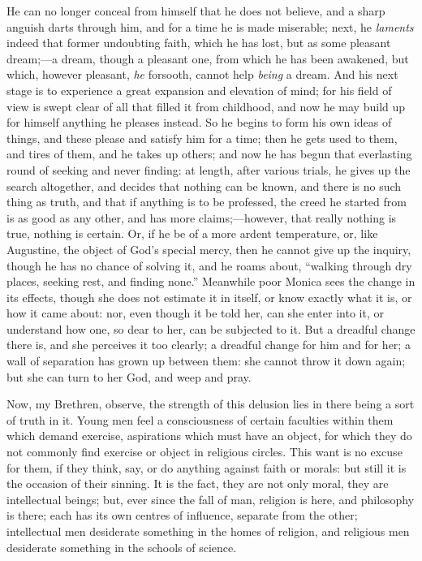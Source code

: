 He can no longer conceal from himself that he does not
believe, and a sharp anguish darts through him, and for a
time he is made miserable; next, he \emph{laments}
indeed that former undoubting faith, which he has lost,
but as some pleasant dream;—a dream, though a
pleasant one, from which he has been awakened, but which,
however pleasant, \emph{he} forsooth, cannot help \emph{being}
a dream. And his next stage is to experience a great
expansion and elevation of mind; for his field of view is
swept clear of all that filled it from childhood, and now
he may build up for himself anything he pleases instead.
So he begins to form his own ideas of things, and these
please and satisfy him for a time; then he gets used to
them, and tires of them, and he takes up others; and now
he has begun that everlasting round of seeking and never
finding: at length, after various trials, he gives up the
search altogether, and decides that nothing can be known,
and there is no such thing as truth, and that if anything
is to be professed, the creed he started from is as good
as any other, and has more claims;—however, that
really nothing is true, nothing is certain. Or, if he be
of a more ardent temperature, or, like Augustine, the
object of God's special mercy, then he cannot give up the
inquiry, though he has no chance of solving it, and he
roams about, ``walking through dry places, seeking
rest, and finding none.'' Meanwhile poor Monica sees
the change in its effects, though she does not estimate
it in itself, or know exactly what it is, or how it came
about: nor, even though it be told her, can she enter
into it, or understand how one, so dear to her, can be
subjected to it. But a dreadful change there is, and she
perceives it too clearly; a dreadful change for him and
for her; a wall of separation has grown up between them:
she cannot throw it down again; but she can turn to her
God, and weep and pray.

Now, my Brethren, observe, the strength of this
delusion lies in there being a sort of truth in it. Young
men feel a consciousness of certain faculties within them
which demand exercise, aspirations which must have an
object, for which they do not commonly find exercise or
object in religious circles. This want is no excuse for
them, if they think, say, or do anything against faith or
morals: but still it is the occasion of their sinning. It
is the fact, they are not only moral, they are
intellectual beings; but, ever since the fall of man,
religion is here, and philosophy is there; each has its
own centres of influence, separate from the other;
intellectual men desiderate something in the homes of
religion, and religious men desiderate something in the
schools of science.

